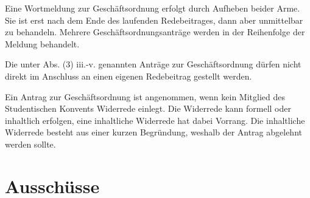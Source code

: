 \documentclass[10pt,a4paper]{scrartcl}
\begin{document}
\begin{contract}
Eine Wortmeldung zur Geschäftsordnung erfolgt durch Aufheben
beider Arme. Sie ist erst nach dem Ende des laufenden Redebeitrages,
dann aber unmittelbar zu behandeln. Mehrere Geschäftsordnungsanträge
werden in der Reihenfolge der Meldung behandelt. 

Die unter Abs. (3) iii.-v. genannten Anträge zur Geschäftsordnung dürfen nicht
direkt im Anschluss an einen eigenen Redebeitrag gestellt werden.

Ein Antrag zur Geschäftsordnung ist angenommen, wenn kein Mitglied des
Studentischen Konvents Widerrede einlegt. Die Widerrede kann formell oder
inhaltlich erfolgen, eine inhaltliche Widerrede hat dabei Vorrang. Die
inhaltliche Widerrede besteht aus einer kurzen Begründung, weshalb der Antrag
abgelehnt werden sollte.

\end{contract}


\section{Ausschüsse}\label{ausschuxfcsse}
\end{document}
